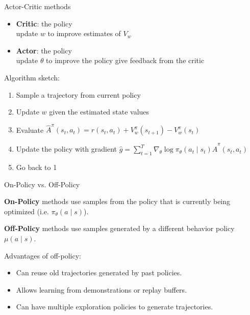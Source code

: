 \documentclass[usenames,dvipsnames,notes,11pt,aspectratio=169,hyperref={colorlinks=true, linkcolor=blue}]{beamer}
\begin{document}
\begin{frame}
    {Actor-Critic methods}
    \begin{itemize}
        \item {\bf Critic}:  the policy\\
            update $w$ to improve estimates of $V_w$\\
        \item {\bf Actor}:  the policy\\
            update $\theta$ to improve the policy give feedback from the critic
    \end{itemize}

    \pause
    Algorithm sketch:\\
    \begin{enumerate}
        \item Sample a trajectory from current policy
        \item Update $w$ given the estimated state values
        \item Evaluate $\hat{A}^\pi(s_t, a_t) = r(s_t, a_t) + V^\pi_w(s_{t+1}) - V^\pi_w(s_{t})$
        \item Update the policy with gradient $\hat{g} = \sum_{t=1}^T \nabla_\theta\log\pi_\theta(a_t\mid s_t)\hat{A}^\pi(s_t, a_t)$ 
        \item Go back to 1
    \end{enumerate}
\end{frame}

\begin{frame}{On-Policy vs. Off-Policy}
  \begin{wideitemize}
      \item \textbf{On-Policy} methods use samples from the policy that is currently being optimized (i.e. $\pi_\theta(a\mid s)$).
    \item \textbf{Off-Policy} methods use samples generated by a different behavior policy $\mu(a \mid s)$.
    \item Advantages of off-policy:\pause
    \begin{itemize}
      \item Can reuse old trajectories generated by past policies.
      \item Allows learning from demonstrations or replay buffers.
      \item Can have multiple exploration policies to generate trajectories.
    \end{itemize}
  \end{wideitemize}
\end{frame}
\end{document}
